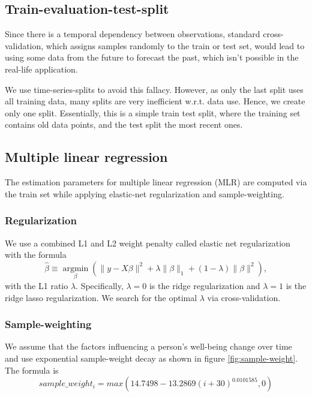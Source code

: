 \documentclass[conference]{IEEEtran}
\begin{document}
\subsection{Train-evaluation-test-split}
Since there is a temporal dependency between observations, standard cross-validation, which assigns samples randomly to the train or test set, would lead to using some data from the future to forecast the past, which isn't possible in the real-life application. 

We use time-series-splits to avoid this fallacy. However, as only the last split uses all training data, many splits are very inefficient w.r.t. data use. Hence, we create only one split. Essentially, this is a simple train test split, where the training set contains old data points, and the test split the most recent ones.



\subsection{Multiple linear regression}
The estimation parameters for multiple linear regression (MLR) are computed via the train set while applying elastic-net regularization and sample-weighting.


\subsubsection{Regularization}
We use a combined L1 and L2 weight penalty called elastic net regularization with the formula 
\begin{equation}
\hat{\beta} \equiv \underset{\beta}{\operatorname{argmin}}\left(\|y-X \beta\|^{2}+\lambda\|\beta\|_{1}+(1-\lambda)\|\beta\|^{2}\right),
\end{equation}
with the L1 ratio $\lambda$.
Specifically, $\lambda=0$ is the ridge regularization and $\lambda=1$ is the ridge lasso regularization. We search for the optimal $\lambda$ via cross-validation.


\subsubsection{Sample-weighting}
We assume that the factors influencing a person's well-being change over time and use exponential sample-weight decay as shown in figure \ref{fig:sample-weight}.
The formula is 
\begin{equation}
sample\_weight_i = max(14.7498-13.2869(i + 30)^{0.0101585},0)
\end{equation}
\end{document}
